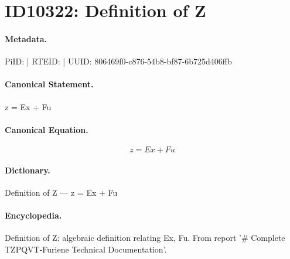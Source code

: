 \section*{ID10322: Definition of Z}
\paragraph{Metadata.}
PiID:  | RTEID:  | UUID: 806469f0-c876-54b8-bf87-6b725d406ffb

\paragraph{Canonical Statement.}
z = Ex + Fu

\paragraph{Canonical Equation.}
\[
z = Ex + Fu
\]

\paragraph{Dictionary.}
Definition of Z — z = Ex + Fu

\paragraph{Encyclopedia.}
Definition of Z: algebraic definition relating Ex, Fu. From report '\# Complete TZPQVT-Furiene Technical Documentation'.

